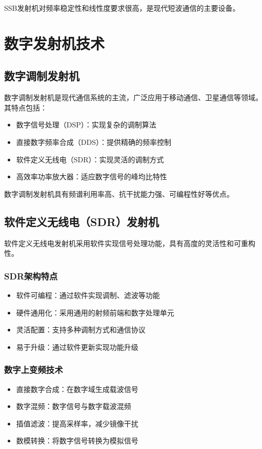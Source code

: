 \documentclass[12pt,UTF8]{ctexbook}
\begin{document}
SSB发射机对频率稳定性和线性度要求很高，是现代短波通信的主要设备。

\chapter{数字发射机技术}

\section{数字调制发射机}

数字调制发射机是现代通信系统的主流，广泛应用于移动通信、卫星通信等领域。其特点包括：

\begin{itemize}[leftmargin=3.5em]
    \item 数字信号处理（DSP）：实现复杂的调制算法
    \item 直接数字频率合成（DDS）：提供精确的频率控制
    \item 软件定义无线电（SDR）：实现灵活的调制方式
    \item 高效率功率放大器：适应数字信号的峰均比特性
\end{itemize}

数字调制发射机具有频谱利用率高、抗干扰能力强、可编程性好等优点。

\section{软件定义无线电（SDR）发射机}

软件定义无线电发射机采用软件实现信号处理功能，具有高度的灵活性和可重构性。

\subsection{SDR架构特点}
\begin{itemize}[leftmargin=3.5em]
    \item 软件可编程：通过软件实现调制、滤波等功能
    \item 硬件通用化：采用通用的射频前端和数字处理单元
    \item 灵活配置：支持多种调制方式和通信协议
    \item 易于升级：通过软件更新实现功能升级
\end{itemize}

\subsection{数字上变频技术}
\begin{itemize}[leftmargin=3.5em]
    \item 直接数字合成：在数字域生成载波信号
    \item 数字混频：数字信号与数字载波混频
    \item 插值滤波：提高采样率，减少镜像干扰
    \item 数模转换：将数字信号转换为模拟信号
\end{itemize}
\end{document}
